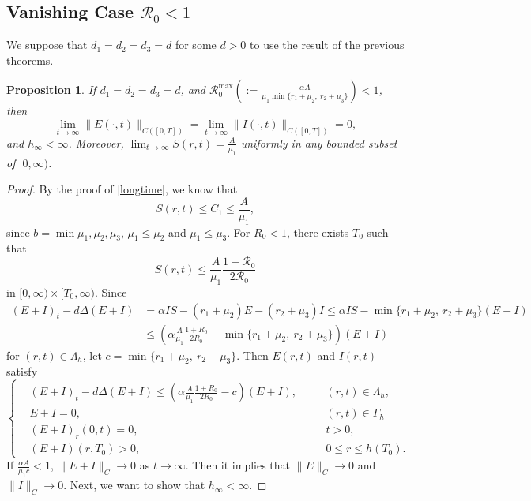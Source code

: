\documentclass[11pt]{amsart}
\numberwithin{equation}{section}
\theoremstyle{plain}
\newtheorem{proposition}[theorem]{Proposition}
\theoremstyle{definition}
\begin{document}
\subsection{Vanishing Case $\mathcal R_0<1$}
We suppose that $d_1=d_2=d_3=d$ for some $d>0$ to use the result of the previous theorems.
\begin{proposition}\label{theorem 4.2}
	If $d_1=d_2=d_3=d$, and $\mathcal R_0^{\max}(:=\frac{\alpha A}{\mu_1 \min \{ r_1+\mu_2,\ r_2+\mu_3\}})<1$, then \[\lim_{t \to \infty}\lVert E(\cdot,t) \rVert_{C([0,T])}=\lim_{t \to \infty}\lVert I(\cdot,t) \rVert_{C([0,T])}=0,\] and $h_\infty<\infty$. Moreover, $\lim_{t \to \infty}S(r,t)=\frac{A}{\mu_1}$ uniformly in any bounded subset of $[0,\infty)$.
\end{proposition}
\begin{proof}
	By the proof of \cref{longtime}, we know that
	\begin{equation*}
		S(r,t)\leq C_1 \leq \frac{A}{\mu_1},
	\end{equation*}
	since $b=\min{\mu_1, \mu_2, \mu_3}$, $\mu_1 \leq \mu_2$ and $\mu_1 \leq \mu_3$. For $R_0<1$, there exists $T_0$ such that
	\begin{equation*}
		S(r,t) \leq \frac{A}{\mu_1}\frac{1+\mathcal R_0}{2\mathcal R_0}
	\end{equation*}
	in $[0,\infty) \times [T_0,\infty)$. Since
	\begin{equation*}
		\begin{aligned}
			(E+I)_t-d\Delta (E+I)&=\alpha IS-(r_1+\mu_2)E-(r_2+\mu_3)I \leq\alpha IS -\min \{ r_1+\mu_2,\ r_2+\mu_3\}(E+I)\\
			&\leq\left( \alpha \frac{A}{\mu_1} \frac{1+R_0}{2R_0}-\min\{ r_1+\mu_2,\ r_2+\mu_3\}\right)(E+I)
		\end{aligned}
	\end{equation*}
	for $(r,t) \in \Lambda_h$, let $c=\min \{ r_1+\mu_2,\ r_2+\mu_3\}$. Then $E(r,t)$ and $I(r,t)$ satisfy
	\begin{equation*}
		\left \{ \begin{aligned}
			&(E+I)_t-d\Delta (E+I)\leq\left( \alpha \frac{A}{\mu_1} \frac{1+R_0}{2R_0}-c\right)(E+I),\quad &&(r,t)\in \Lambda_h,\\
			&E+I=0, &&(r,t) \in \Gamma_h\\
			&(E+I)_r(0,t)=0, &&t>0,\\
			&(E+I)(r,T_0)>0, &&0\leq r \leq h(T_0).
		\end{aligned} \right.
	\end{equation*}
	If $\frac{\alpha A}{\mu_1c}<1$, $\lVert E+I \rVert_C \to 0$ as $t \to \infty$. Then it implies that $\lVert E \rVert_C \to 0$ and $\lVert I \rVert_C \to 0$. Next, we want to show that $h_\infty < \infty$.

\end{proof}
\end{document}
